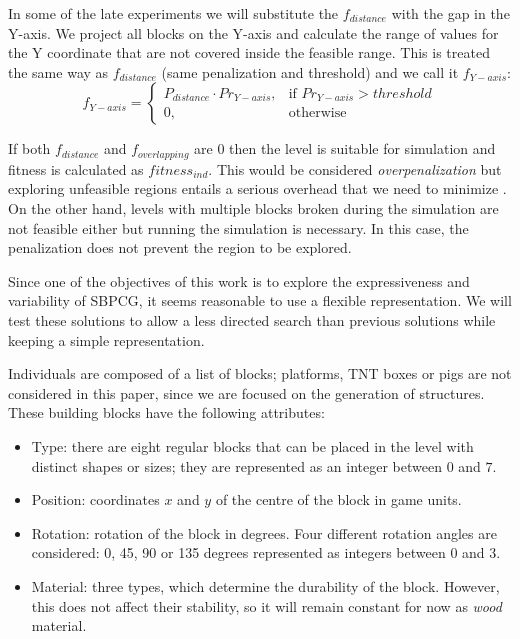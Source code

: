 \documentclass[a4paper,twoside]{article}
\begin{document}
In some of the late experiments we will substitute the $f_{distance}$
with the gap in the Y-axis.
We project all blocks on the Y-axis and calculate the range of values for the Y coordinate
that are not covered inside the feasible range. This is treated the same way as $f_{distance}$
(same penalization and threshold) and we call it $f_{Y-axis}$:
$$f_{Y-axis} = 
\begin{cases}
P_{distance}\cdot Pr_{Y-axis}, & \text{if } Pr_{Y-axis} > threshold\\
0, & \text{otherwise}
\end{cases}
$$

If both $f_{distance}$ and $f_{overlapping}$ are $0$ then the level is suitable 
for simulation and fitness is calculated as $fitness_{ind}$. This would be 
considered \textit{overpenalization} but exploring unfeasible regions entails a 
serious overhead that we need to minimize \cite{runarsson2003evolutionary}. 
On the other hand, levels with 
multiple blocks broken during the simulation are not feasible either but 
running the simulation is necessary. In this case, the penalization does not 
prevent the region to be explored.

Since one of the objectives of this work is to explore the expressiveness 
and variability of SBPCG, it seems reasonable to use a flexible representation. 
We will test these solutions to allow a less directed search than previous solutions while keeping a 
simple representation. 

Individuals are composed of a list of blocks; platforms, TNT boxes or pigs are not considered in this 
paper, since we are focused on the generation of structures. These
building blocks have the following attributes:

\begin{itemize}
	\item Type: there are eight regular blocks that can be placed in the level 
	with distinct shapes or sizes; they are represented as an
        integer between $0$ and $7$.
	\item Position: coordinates $x$ and $y$ of the centre of the block in game 
	units.
	\item Rotation: rotation of the block in degrees. Four different 
	rotation angles are considered: 0, 45, 90 or 135 degrees represented as integers 
	between $0$ and $3$.
        \item Material: three types, which determine the durability 
of the block. However, this does not affect their stability, so it will remain 
constant for now as \textit{wood} material.
\end{itemize}
\end{document}
